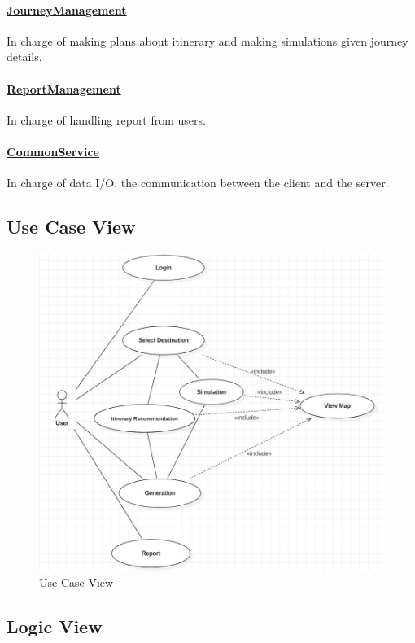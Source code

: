 \documentclass[10pt]{article}
\begin{document}
\paragraph{\underline{JourneyManagement}} In charge of making plans about itinerary and making simulations given journey details.

\paragraph{\underline{ReportManagement}} In charge of handling report from users.

\paragraph{\underline{CommonService}} In charge of data I/O, the communication between the client and the server.

\subsection{Use Case View}
\begin{figure}[H]
	\centering
	
	\includegraphics[width=14cm]{usecase.jpg}
	\caption{Use Case View}
	\label{Use Case View}
\end{figure}

\subsection{Logic View}
\end{document}

